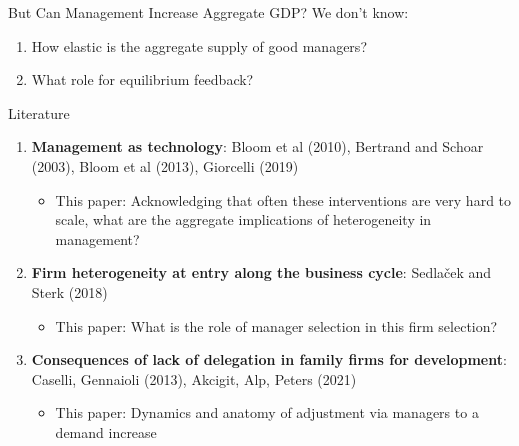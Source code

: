 \documentclass[
  ignorenonframetext,
  aspectratio=1610,
]{beamer}
\providecommand{\tightlist}{%
  \setlength{\itemsep}{0pt}\setlength{\parskip}{0pt}}
\begin{document}
\begin{frame}{But Can Management Increase Aggregate GDP?}
\protect\hypertarget{but-can-management-increase-aggregate-gdp}{}
We don't know:

\begin{enumerate}
\tightlist
\item
  How elastic is the aggregate supply of good managers?
\item
  What role for equilibrium feedback?
\end{enumerate}
\end{frame}

\begin{frame}{Literature}
\protect\hypertarget{literature}{}
\begin{enumerate}
\tightlist
\item
  \textbf{Management as technology}: Bloom et al (2010), Bertrand and
  Schoar (2003), Bloom et al (2013), Giorcelli (2019)

  \begin{itemize}
  \tightlist
  \item
    This paper: Acknowledging that often these interventions are very
    hard to scale, what are the aggregate implications of heterogeneity
    in management?
  \end{itemize}
\item
  \textbf{Firm heterogeneity at entry along the business cycle}:
  Sedlaček and Sterk (2018)

  \begin{itemize}
  \tightlist
  \item
    This paper: What is the role of manager selection in this firm
    selection?
  \end{itemize}
\item
  \textbf{Consequences of lack of delegation in family firms for
  development}: Caselli, Gennaioli (2013), Akcigit, Alp, Peters (2021)

  \begin{itemize}
  \tightlist
  \item
    This paper: Dynamics and anatomy of adjustment via managers to a
    demand increase
  \end{itemize}
\end{enumerate}
\end{frame}
\end{document}
